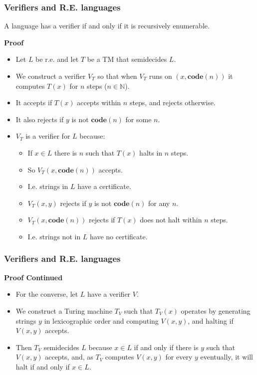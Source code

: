 \documentclass[handout]{beamer}
\newcommand{\bN}{\mathbb{N}}
\newcommand{\co}{\mathbf{code}}
\begin{document}
\begin{frame}
\frametitle{Verifiers and R.E. languages}
\begin{theorem}
A language has a verifier if and only if it is recursively enumerable.
\end{theorem}
\textbf{Proof}
\begin{itemize}
\item Let $L$ be r.e. and let $T$ be a TM that semidecides $L$. 
\item We construct a verifier $V_T$ so that when $V_T$ runs on $(x,\co(n))$ it computes $T(x)$ for $n$ steps ($n\in \bN$). 
\item It accepts if $T(x)$ accepts within $n$ steps, and rejects otherwise. 
\item It also rejects if $y$ is not $\co(n)$ for some $n$.
\item $V_T$ is a verifier for $L$ because: 
\begin{itemize}
\item If $x\in L$ there is $n$ such that $T(x)$ halts in $n$ steps.
\item So $V_T(x,\co(n))$ accepts.
\item I.e. strings in $L$ have a certificate.
\item $V_T(x,y)$ rejects if $y$ is not $\co(n)$ for any $n$.
\item $V_T(x,\co(n))$ rejects if $T(x)$ does not halt within $n$ steps.
\item I.e. strings not in $L$ have no certificate.
\end{itemize}
\end{itemize} 
\end{frame}

\begin{frame}
\frametitle{Verifiers and R.E. languages}
\textbf{Proof Continued}
\begin{itemize}
\item For the converse, let $L$ have a verifier $V$. 
\vspace{0.5cm}
\item We construct a Turing machine $T_V$ such that $T_V(x)$ operates by generating strings $y$ in lexicographic order and computing $V(x,y)$, and halting if $V(x,y)$ accepts. 
\vspace{0.5cm}
\item Then $T_V$ semidecides $L$ because $x\in L$ if and only if there is $y$ such that $V(x,y)$ accepts, and, as $T_V$ computes $V(x,y)$ for every $y$ eventually, it will halt if and only if $x\in L$.  
\end{itemize} 
\end{frame}
\end{document}
